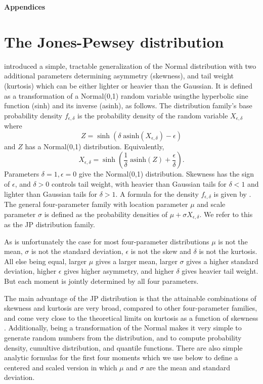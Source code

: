 \documentclass[12pt]{article}
\newcounter{box}
\newcommand{\be}{\begin{equation}}
\newcommand{\ee}{\end{equation}}
\begin{document}
\centerline{\Large{\textbf{Appendices}}}

\section{The Jones-Pewsey distribution} 
\citet{jones-pewsey-2009} introduced a simple, tractable generalization of the Normal distribution with two additional parameters determining  
asymmetry (skewness), and tail weight (kurtosis) which can be either lighter or heavier than the Gaussian. It is defined as a transformation
of a Normal(0,1) random variable usingthe hyperbolic sine function (sinh) and its inverse (asinh), as follows. The distribution family's base probability density  
$f_{\epsilon,\delta}$  is the probability density of the random variable $X_{\epsilon,\delta}$ where  
\be
Z = \sinh (\delta \; \mbox{asinh}(X_{\epsilon,\delta}) - \epsilon)
\label{eqn:JP1}
\ee
and $Z$ has a Normal(0,1) distribution.  Equivalently, 
\be
X_{\epsilon,\delta} = \sinh \left( \frac{1}{\delta} \; \mbox{asinh}(Z) + \frac{\epsilon}{\delta}\right).
\label{eqn:JP2}
\ee
Parameters $\delta=1, \epsilon=0$ give the Normal(0,1) distribution. Skewness has the sign of $\epsilon$, and
$\delta > 0$ controls tail weight, with heavier than Gaussian tails for $\delta<1$ and lighter than Gaussian tails for $\delta > 1$. 
A formula for the density $f_{\epsilon,\delta}$ is given by \citet[][eqn. 2]{jones-pewsey-2009}. 
The general four-parameter family with location parameter $\mu$ and scale parameter $\sigma$ is defined as the probability densities 
of $\mu + \sigma X_{\epsilon, \delta}$. We refer to this as the JP distribution family. 

As is unfortunately the case for most four-parameter distributions $\mu$ is not the mean, $\sigma$ is not the standard deviation, $\epsilon$ is not
the skew and $\delta$ is not the kurtosis. All else being equal, larger $\mu$  gives a larger mean, larger $\sigma$ gives a higher
standard deviation, higher $\epsilon$ gives higher asymmetry, and higher $\delta$ gives heavier tail weight.  But each moment is jointly determined 
by all four parameters. 

The main advantage of the JP distribution is that the attainable combinations of skewness and kurtosis are very broad, compared to other 
four-parameter families, and come very close to the theoretical limits on kurtosis as a function of skewness \citep[][Fig.  2]{jones-pewsey-2009}. 
Additionally, being a transformation of the Normal makes it very simple to generate random numbers from the distribution, and to compute 
probability density, cumultive distribution, and quantile functions. There are also simple analytic formulas for the first four moments
\citep[][p. 764]{jones-pewsey-2009} which we use below to define a centered and scaled version in which $\mu$ and $\sigma$ 
are the mean and standard deviation. 
\end{document}
